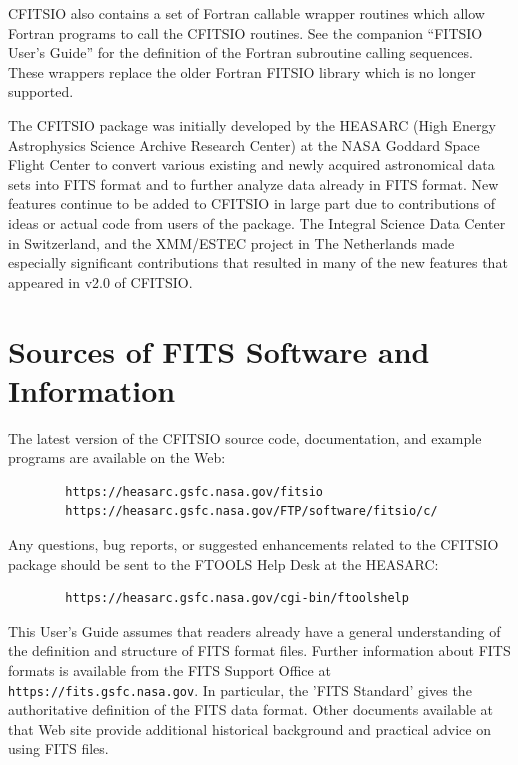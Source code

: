 \documentclass[11pt]{book}
\begin{document}
CFITSIO also contains a set of Fortran callable wrapper routines which
allow Fortran programs to call the CFITSIO routines.  See the companion
``FITSIO User's Guide'' for the definition of the Fortran subroutine
calling sequences.  These wrappers replace the older Fortran FITSIO
library which is no longer supported.

The CFITSIO package was initially developed by the HEASARC (High Energy
Astrophysics Science Archive Research Center) at the NASA Goddard Space
Flight Center to convert various existing and newly acquired
astronomical data sets into FITS format and to further analyze data
already in FITS format.  New features continue to be added to CFITSIO
in large part due to contributions of ideas or actual code from
users of the package.  The Integral Science Data Center in Switzerland,
and the XMM/ESTEC project in The Netherlands made especially significant
contributions that resulted in many of the new features that appeared
in v2.0 of CFITSIO.


\section{Sources of FITS Software and Information}

The latest version of the CFITSIO source code,
documentation, and example programs are available on the
Web:

\begin{verbatim}
        https://heasarc.gsfc.nasa.gov/fitsio
        https://heasarc.gsfc.nasa.gov/FTP/software/fitsio/c/
\end{verbatim}

Any questions, bug reports, or suggested enhancements related to the CFITSIO
package should be sent to the FTOOLS Help Desk at the HEASARC:

\begin{verbatim}
        https://heasarc.gsfc.nasa.gov/cgi-bin/ftoolshelp
\end{verbatim}

This User's Guide assumes that readers already have a general
understanding of the definition and structure of FITS format files.
Further information about FITS formats is available from the FITS Support
Office at {\tt https://fits.gsfc.nasa.gov}.  In particular, the
'FITS Standard' gives the authoritative definition of the FITS data
format.  Other documents available at that Web site
provide additional historical background
and practical advice on using FITS files.
\end{document}
